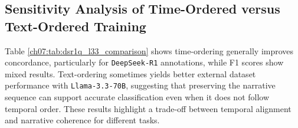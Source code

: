 \subsection{Sensitivity Analysis of Time-Ordered versus Text-Ordered Training}\label{ch07:apd:sensitivity_analyses}



{\raggedright
Table \ref{ch07:tab:dsr1q_l33_comparison} shows time-ordering generally improves concordance, particularly for \texttt{DeepSeek-R1} annotations, while F1 scores show mixed results. Text-ordering sometimes yields better external dataset performance with \texttt{Llama-3.3-70B}, suggesting that preserving the narrative sequence can support accurate classification even when it does not follow temporal order.  These results highlight a trade-off between temporal alignment and narrative coherence for different tasks.


\par}






    






\FloatBarrier
